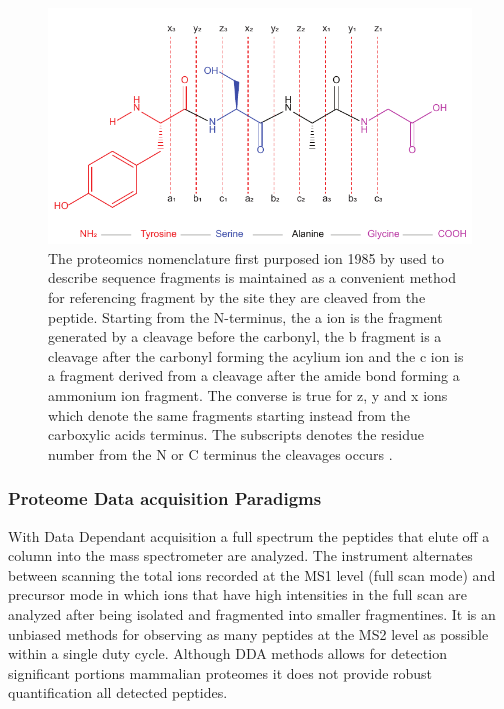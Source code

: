 \documentclass[a4paper,11pt,twoside]{book}
\begin{document}
	
	\begin{figure}
		\centering
		\includegraphics[width=0.6\linewidth]{3.Proteomics/peptide_frags.pdf}
		\caption{The proteomics nomenclature first purposed ion 1985 by \citep{Roepstorff1984LetterEditors} used to describe sequence fragments is maintained as a convenient method for referencing fragment by the site they are cleaved from the peptide. Starting from the N-terminus, the a ion is the fragment generated by a cleavage before the carbonyl, the b fragment is a cleavage after the carbonyl forming the acylium ion and the c ion is a fragment derived from a cleavage after the amide bond forming a ammonium ion fragment. The converse is true for z, y and x ions which denote the same fragments starting instead from the carboxylic acids terminus. The subscripts denotes the residue number from the N or C terminus the cleavages occurs \citep{Roepstorff1984LetterEditors}.}
		\label{Tri_peptide_seq}
	\end{figure}
	
	
	\subsubsection{Proteome Data acquisition Paradigms}
	
	With Data Dependant acquisition a full spectrum the peptides that elute off a column into the mass spectrometer are analyzed. The instrument alternates between scanning the total ions recorded at the MS1 level (full scan mode) and precursor mode in which ions that have high intensities in the full scan are analyzed after being isolated and fragmented into smaller fragmentines\citep{Bateman2014MaximizingDDA.}. It is an unbiased methods for observing as many peptides at the MS2 level as possible within a single duty cycle. Although DDA methods allows for detection significant portions mammalian proteomes it does not provide robust quantification all detected peptides\citep{Richards2015ProteomeDeep.}.
	
\end{document}
